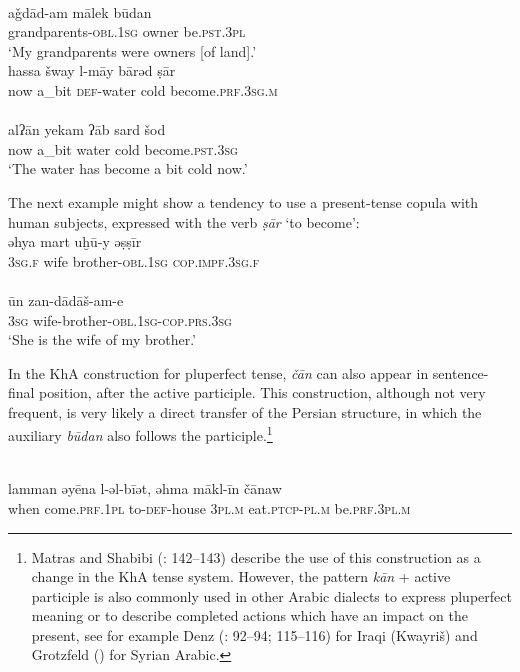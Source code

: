 \documentclass[output=paper,nonflat]{langsci/langscibook}
\begin{document}
\\
\gll aǧdād-am mālek būdan\\
     grandparents-\textsc{obl.1sg} owner be.\textsc{pst.3pl}\\
\glt ‘My grandparents were owners [of land].’
\z\z
\newpage
\ea\label{cold}
\\
\gll hassa šway l-māy bārəd ṣār\\
     now a\_bit \textsc{def}{}-water cold become.\textsc{prf.3sg.m}\\
 
\\
\gll alʔān yekam ʔāb sard šod\\
     now a\_bit water cold become.\textsc{pst}.\textsc{3sg}\\
\glt ‘The water has become a bit cold now.’
\z\z

The next example might show a tendency to use a present-tense copula with human subjects, expressed with the verb \textit{ṣār} ‘to become’: 
\ea
{}\\
\gll əhya mart uḫū-y əṣṣīr\\
     3\textsc{sg.f} wife brother-\textsc{obl.1sg} \textsc{cop.impf.3sg.f}\\
 
\\
\gll ūn zan-dādāš-am-e\\
     3\textsc{sg} wife-brother-\textsc{obl.1sg}-\textsc{cop.prs.3sg}\\
\glt ‘She is the wife of my brother.’
\z\z


In the KhA construction for pluperfect tense, \textit{čān} can also appear in sentence-final position, after the active participle. This construction, although not very frequent, is very likely a direct transfer of the Persian structure, in which the auxiliary \textit{būdan} also follows the participle.\footnote{Matras and Shabibi (\citeyear{MatrasShabibi2007}: 142–143) describe the use of this construction as a change in the KhA tense system. However, the pattern \textit{kān} + active participle is also commonly used in other Arabic dialects to express pluperfect meaning or to describe completed actions which have an impact on the present, see for example Denz (\citeyear{Denz1971}: 92–94; 115–116) for Iraqi (Kwayriš) and Grotzfeld (\citeyear[88]{Grotzfeld1965}) for Syrian Arabic.} 

\ea {}\\
\gll lamman əyēna l-əl-bīət, əhma mākl-īn čānaw\\
     when come.\textsc{prf.1pl} to-\textsc{def}-house 3\textsc{pl}.\textsc{m} eat.\textsc{ptcp-pl.m} be.\textsc{prf}.\textsc{3pl.m}\\
\end{document}
